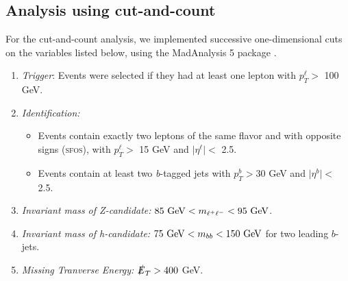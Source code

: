 \documentclass[a4paper,11pt]{article}
\providecommand{\tightlist}{%
     \setlength{\itemsep}{0pt}\setlength{\parskip}{0pt}}
\newcommand{\met}{{\slashed{E}_T}}
\begin{document}
\subsection{Analysis using cut-and-count}
\label{event-selection}

For the cut-and-count analysis, we implemented successive one-dimensional cuts
on the variables listed below, using the MadAnalysis 5 package
\cite{Conte:2012fm}.

\begin{enumerate}
  \tightlist
  \item \emph{Trigger}: Events were selected if they had at least one lepton
    with $p_{T}^\ell >$ 100 GeV. 

  \item \emph{Identification:}

    \begin{itemize}
      \item Events contain exactly two leptons of the same flavor
        and with opposite signs (\textsc{sfos}), with $p_{T}^\ell >$ 15 GeV and
        $\vert\eta^\ell\vert <$ 2.5.
      \item Events contain at least two \emph{b}-tagged jets with
        $p_{T}^b > 30$ GeV and $\vert\eta^b\vert <$ 2.5.
    \end{itemize}

  \item \emph{Invariant mass of Z-candidate:}  $85\ {\rm GeV}<m_{\ell^{+}\ell^{-}}<95\ {\rm GeV}$.

  \item \emph{Invariant mass of h-candidate:} $75\ {\rm GeV}<m_{bb}<150\ {\rm GeV}$ for two leading $b$-jets.

  \item \emph{Missing Tranverse Energy:}  $\met> 400$ GeV.


\end{enumerate}
\end{document}
